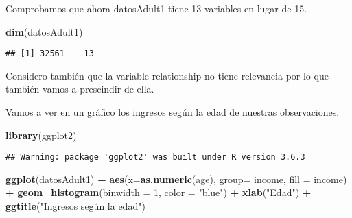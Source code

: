 \documentclass[]{article}
\newenvironment{Shaded}{\begin{snugshade}}{\end{snugshade}}
\newcommand{\DataTypeTok}[1]{\textcolor[rgb]{0.13,0.29,0.53}{#1}}
\newcommand{\DecValTok}[1]{\textcolor[rgb]{0.00,0.00,0.81}{#1}}
\newcommand{\KeywordTok}[1]{\textcolor[rgb]{0.13,0.29,0.53}{\textbf{#1}}}
\newcommand{\NormalTok}[1]{#1}
\newcommand{\OperatorTok}[1]{\textcolor[rgb]{0.81,0.36,0.00}{\textbf{#1}}}
\newcommand{\OtherTok}[1]{\textcolor[rgb]{0.56,0.35,0.01}{#1}}
\newcommand{\StringTok}[1]{\textcolor[rgb]{0.31,0.60,0.02}{#1}}
\begin{document}
Comprobamos que ahora datosAdult1 tiene 13 variables en lugar de 15.

\begin{Shaded}
\begin{Highlighting}[]
\KeywordTok{dim}\NormalTok{(datosAdult1)}
\end{Highlighting}
\end{Shaded}

\begin{verbatim}
## [1] 32561    13
\end{verbatim}

Considero también que la variable relationship no tiene relevancia por
lo que también vamos a prescindir de ella.

\begin{Shaded}
\end{Shaded}

Vamos a ver en un gráfico los ingresos según la edad de nuestras
observaciones.

\begin{Shaded}
\begin{Highlighting}[]
\KeywordTok{library}\NormalTok{(ggplot2)}
\end{Highlighting}
\end{Shaded}

\begin{verbatim}
## Warning: package 'ggplot2' was built under R version 3.6.3
\end{verbatim}

\begin{Shaded}
\begin{Highlighting}[]
\KeywordTok{ggplot}\NormalTok{(datosAdult1) }\OperatorTok{+}\StringTok{ }\KeywordTok{aes}\NormalTok{(}\DataTypeTok{x=}\KeywordTok{as.numeric}\NormalTok{(age), }\DataTypeTok{group=}\NormalTok{ income, }\DataTypeTok{fill =}\NormalTok{ income) }\OperatorTok{+}\StringTok{ }\KeywordTok{geom\_histogram}\NormalTok{(}\DataTypeTok{binwidth =} \DecValTok{1}\NormalTok{, }\DataTypeTok{color =} \StringTok{"blue"}\NormalTok{) }\OperatorTok{+}\StringTok{ }\KeywordTok{xlab}\NormalTok{(}\StringTok{"Edad"}\NormalTok{) }\OperatorTok{+}\StringTok{ }\KeywordTok{ggtitle}\NormalTok{(}\StringTok{"Ingresos según la edad"}\NormalTok{)}
\end{Highlighting}
\end{Shaded}
\end{document}
